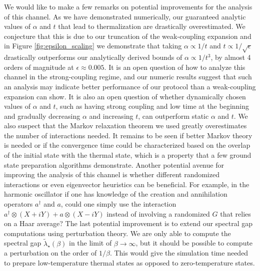 \documentclass[
 amsmath,amssymb,
 aps,
onecolumn, 
nofootinbib]{revtex4-2}
\begin{document}
We would like to make a few remarks on potential improvements for the analysis of this channel. As we have demonstrated numerically, our guaranteed analytic values of $\alpha$ and $t$ that lead to thermalization are drastically overestimated. We conjecture that this is due to our truncation of the weak-coupling expansion and in Figure \ref{fig:epsilon_scaling} we demonstrate that taking $\alpha \propto 1/t$ and $t \propto 1/ \sqrt{\epsilon}$ drastically outperforms our analytically derived bounds of $\alpha \propto 1/t^3$, by almost 4 orders of magnitude at $\epsilon \approx 0.005$. It is an open question of how to analyze this channel in the strong-coupling regime, and our numeric results suggest that such an analysis may indicate better performance of our protocol than a weak-coupling expansion can show. It is also an open question of whether dynamically chosen values of $\alpha$ and $t$, such as having strong coupling and low time at the beginning and gradually decreasing $\alpha$ and increasing $t$, can outperform static $\alpha$ and $t$. We also suspect that the Markov relaxation theorem we used greatly overestimates the number of interactions needed. It remains to be seen if better Markov theory is needed or if the convergence time could be characterized based on the overlap of the initial state with the thermal state, which is a property that a few ground state preparation algorithms demonstrate. Another potential avenue for improving the analysis of this channel is whether different randomized interactions or even eigenvector heuristics can be beneficial. For example, in the harmonic oscillator if one has knowledge of the creation and annihilation operators $a^\dagger$ and $a$, could one simply use the interaction $a^\dagger \otimes (X + i Y) + a \otimes (X - i Y)$ instead of involving a randomized $G$ that relies on a Haar average? The last potential improvement is to extend our spectral gap computations using perturbation theory. We are only able to compute the spectral gap $\widetilde{\lambda}_\star(\beta)$ in the limit of $\beta \to \infty$, but it should be possible to compute a perturbation on the order of $1/\beta$. This would give the simulation time needed to prepare low-temperature thermal states as opposed to zero-temperature states.
\end{document}
